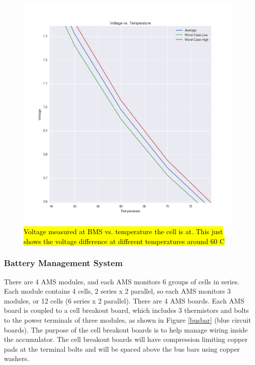 \documentclass{article}
\DeclareRobustCommand{\hlr}[1]{{\sethlcolor{red}\hl{#1}}}
\begin{document}
                \begin{figure}[H]
                \centering
                \includegraphics[width =0.6 \textwidth]{VoltageVSTempZOOM.png}
                \caption{\hlr{Voltage measured at BMS vs. temperature the cell is at. This just shows the voltage difference at different temperatures around 60 \degree C}}
                \label{fig:voltageCellvsTempZOOM}
                \end{figure}

        \subsubsection{Battery Management System} \label{bms}



           There are 4 AMS modules, and each AMS monitors 6 groups of cells in series. Each module contains 4 cells, 2 series x 2 parallel, so each AMS monitors 3 modules, or 12 cells (6 series x 2 parallel). There are 4 AMS boards. Each AMS board is coupled to a cell breakout board, which includes 3 thermistors and bolts to the power terminals of three modules, as shown in Figure \ref{busbar} (blue circuit boards). The purpose of the cell breakout boards is to help manage wiring inside the accumulator. The cell breakout boards will have compression limiting copper pads at the terminal bolts and will be spaced above the bus bars using copper washers.\\
\end{document}
